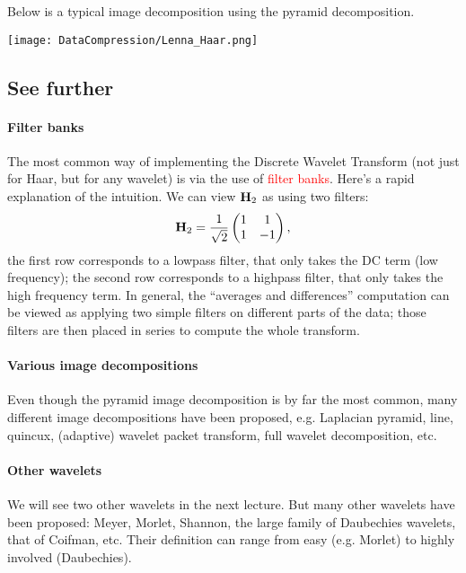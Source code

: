 \documentclass[a4paper, 11pt, openany]{book}
\numberwithin{equation}{section}
\theoremstyle{plain}
\theoremstyle{definition}
\newcommand{\Important}[1]{\textcolor{red}{#1}}
\begin{document}
Below is a typical image decomposition using the pyramid decomposition.

\begin{center}
    \texttt{[image: DataCompression/Lenna\_Haar.png]}
\end{center}


\subsection{See further}

\paragraph{Filter banks}
The most common way of implementing the Discrete Wavelet Transform (not just for Haar, but for any wavelet) is via the use of \Important{filter banks}. Here's a rapid explanation of the intuition. We can view ${\bf H}_2$ as using two filters:
\[
    {\bf H}_2 = \frac{1}{\sqrt{2}} \begin{pmatrix}
    1 & 1\\
    1 & -1
    \end{pmatrix},
\]
the first row corresponds to a lowpass filter, that only takes the DC term (low frequency); the second row corresponds to a highpass filter, that only takes the high frequency term. In general, the ``averages and differences'' computation can be viewed as applying two simple filters on different parts of the data; those filters are then placed in series to compute the whole transform.

\paragraph{Various image decompositions}
Even though the pyramid image decomposition is by far the most common, many different image decompositions have been proposed, e.g. Laplacian pyramid, line, quincux, (adaptive) wavelet packet transform, full wavelet decomposition, etc.



\paragraph{Other wavelets}
We will see two other wavelets in the next lecture. But many other wavelets have been proposed: Meyer, Morlet, Shannon, the large family of Daubechies wavelets, that of Coifman, etc. Their definition can range from easy (e.g. Morlet) to highly involved (Daubechies). 
\end{document}
